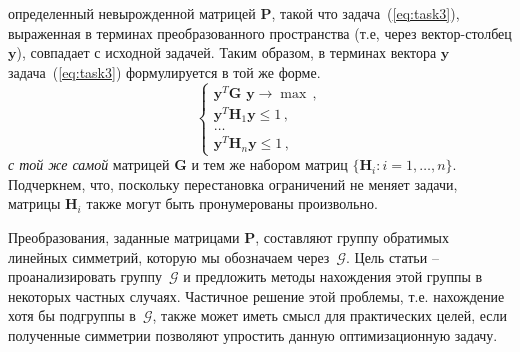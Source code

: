 определенный невырожденной матрицей $\textbf{P}$, такой что задача~(\ref{eq:task3}), выраженная в терминах преобразованного пространства
(т.е, через вектор-столбец $\textbf{y} $), совпадает с исходной задачей. Таким образом, в терминах вектора $\textbf{y}$ задача~(\ref{eq:task3}) формулируется в той же форме.
%
\begin{equation}
\label{eq:Tinit}
\left\{
\begin{array}{l}
\displaystyle
\textbf{y}^T \textbf{G y} \to {\max} \, , \\
\displaystyle
\textbf{y}^T\textbf{H}_1\textbf{y} \le  1 \, , \\
\displaystyle
\dots \\
\textbf{y}^T\textbf{H}_n\textbf{y} \le 1 \, ,
\end{array}
\right.
\end{equation}
%
\textit{с той же самой} матрицей $\textbf{G} $ и тем же набором матриц $\{\textbf{H}_i: i=1,\dots,n\}$. Подчеркнем, что, поскольку перестановка ограничений не меняет задачи, матрицы $\textbf{H}_i$ также могут быть пронумерованы произвольно.

Преобразования, заданные матрицами $\textbf{P}$, составляют группу обратимых линейных симметрий, которую мы обозначаем через~$\mathcal G$. Цель статьи -- проанализировать группу~$\mathcal G$ и предложить методы нахождения этой группы {в некоторых частных случаях}. Частичное решение этой проблемы, т.е. нахождение хотя бы подгруппы в~$\mathcal G$, также может иметь смысл для практических целей, если полученные симметрии позволяют упростить данную оптимизационную задачу.

